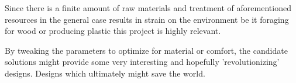 Since there is a finite amount of raw materials and treatment of aforementioned  resources in the general case results in strain on the environment be it foraging for wood or producing plastic this project is highly relevant.


By tweaking the parameters to optimize for material or comfort, the candidate solutions might provide some very interesting and hopefully 'revolutionizing' designs. Designs which ultimately might save the world.
